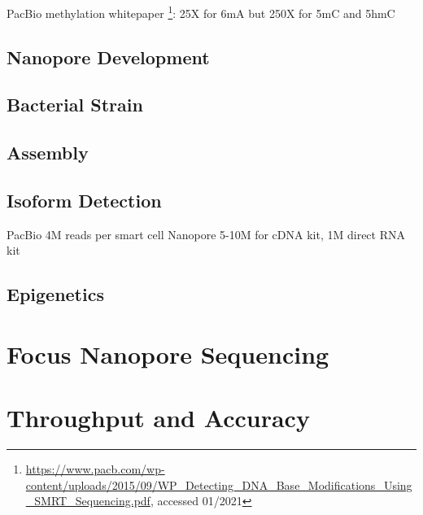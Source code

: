 PacBio methylation whitepaper \footnote{\url{https://www.pacb.com/wp-content/uploads/2015/09/WP_Detecting_DNA_Base_Modifications_Using_SMRT_Sequencing.pdf}, accessed 01/2021}:
25X for 6mA but 250X for 5mC and 5hmC


\subsection{Nanopore Development}
\label{subsec:state_of_art:nanopore}

\subsection{Bacterial Strain}
\label{subsec:state_of_art:strain}

\subsection{Assembly}
\label{subsec:state_of_art:assembly}

\subsection{Isoform Detection}
\label{subsec:state_of_art:isoform}

PacBio 4M reads per smart cell
Nanopore 5-10M for cDNA kit, 1M direct RNA kit

\subsection{Epigenetics}
\label{subsec:state_of_art:epigenetics}




\section{Focus Nanopore Sequencing}
\label{sec:state_of_art:nanopore}








\section{Throughput and Accuracy}
\label{sec:stat_of_art:throughput}

